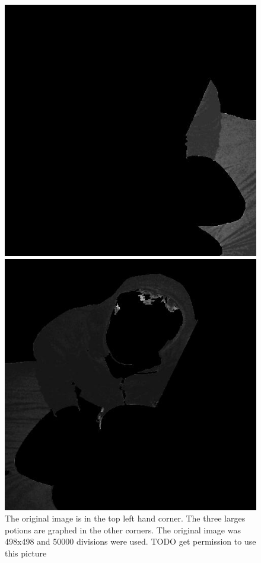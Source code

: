 \begin{figure}[ht]
\begin{minipage}[b]{0.47\linewidth}
\end{minipage}
\begin{minipage}[b]{0.47\linewidth}
\centering
\includegraphics[width=\textwidth]{MSTseg3.jpg}
\end{minipage}
\hspace{0.5cm}
\begin{minipage}[b]{0.47\linewidth}
\centering
\includegraphics[width=\textwidth]{MSTseg4.jpg}
\end{minipage}
\caption{The original image is in the top left hand corner. The three larges potions are graphed in the other corners. The original image was 498x498 and 50000 divisions were used. TODO get permission to use this picture}
\end{figure}
\vfill

